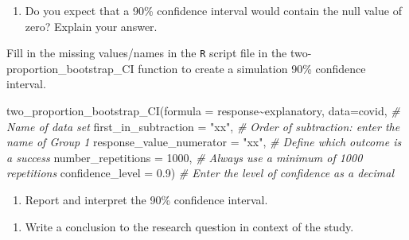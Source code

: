 \documentclass[
]{report}
\newenvironment{Shaded}{\begin{snugshade}}{\end{snugshade}}
\newcommand{\AttributeTok}[1]{\textcolor[rgb]{0.77,0.63,0.00}{#1}}
\newcommand{\CommentTok}[1]{\textcolor[rgb]{0.56,0.35,0.01}{\textit{#1}}}
\newcommand{\DecValTok}[1]{\textcolor[rgb]{0.00,0.00,0.81}{#1}}
\newcommand{\FloatTok}[1]{\textcolor[rgb]{0.00,0.00,0.81}{#1}}
\newcommand{\FunctionTok}[1]{\textcolor[rgb]{0.00,0.00,0.00}{#1}}
\newcommand{\NormalTok}[1]{#1}
\newcommand{\SpecialCharTok}[1]{\textcolor[rgb]{0.00,0.00,0.00}{#1}}
\newcommand{\StringTok}[1]{\textcolor[rgb]{0.31,0.60,0.02}{#1}}
\providecommand{\tightlist}{%
  \setlength{\itemsep}{0pt}\setlength{\parskip}{0pt}}
\begin{document}
\vspace{0.8in}

\begin{enumerate}
\def\labelenumi{\arabic{enumi}.}
\setcounter{enumi}{9}
\tightlist
\item
  Do you expect that a 90\% confidence interval would contain the null value of zero? Explain your answer.
\end{enumerate}

\vspace{0.8in}

Fill in the missing values/names in the \texttt{R} script file in the two-proportion\_bootstrap\_CI function to create a simulation 90\% confidence interval.

\begin{Shaded}
\begin{Highlighting}[]
\FunctionTok{two\_proportion\_bootstrap\_CI}\NormalTok{(}\AttributeTok{formula =}\NormalTok{ response}\SpecialCharTok{\textasciitilde{}}\NormalTok{explanatory, }
        \AttributeTok{data=}\NormalTok{covid, }\CommentTok{\# Name of data set}
        \AttributeTok{first\_in\_subtraction =} \StringTok{"xx"}\NormalTok{, }\CommentTok{\# Order of subtraction: enter the name of Group 1}
        \AttributeTok{response\_value\_numerator =} \StringTok{"xx"}\NormalTok{, }\CommentTok{\# Define which outcome is a success }
        \AttributeTok{number\_repetitions =} \DecValTok{1000}\NormalTok{, }\CommentTok{\# Always use a minimum of 1000 repetitions}
        \AttributeTok{confidence\_level =} \FloatTok{0.9}\NormalTok{) }\CommentTok{\# Enter the level of confidence as a decimal}
\end{Highlighting}
\end{Shaded}

\begin{enumerate}
\def\labelenumi{\arabic{enumi}.}
\setcounter{enumi}{10}
\tightlist
\item
  Report and interpret the 90\% confidence interval.
\end{enumerate}

\vspace{0.8in}

\begin{enumerate}
\def\labelenumi{\arabic{enumi}.}
\setcounter{enumi}{11}
\tightlist
\item
  Write a conclusion to the research question in context of the study.
\end{enumerate}

\vspace{0.8in}
\end{document}
